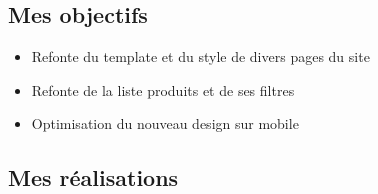 \documentclass[a4paper,11pt,twoside]{report}
\begin{document}
    \subsection*{Mes objectifs}
      \begin{itemize}

	\item Refonte du template et du style de divers pages du site
	\item Refonte de la liste produits et de ses filtres
	\item Optimisation du nouveau design sur mobile

      \end{itemize}
    \subsection*{Mes réalisations}
\end{document}
